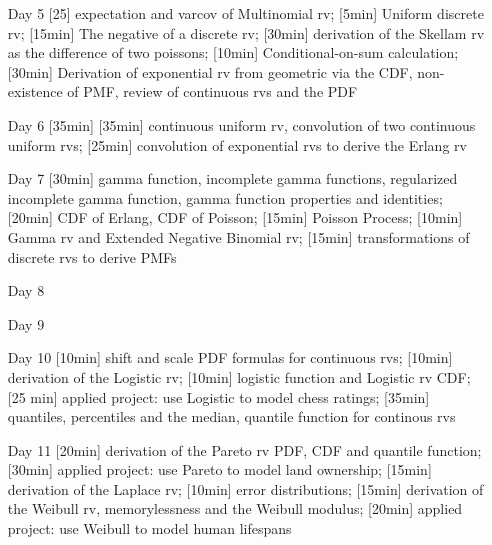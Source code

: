 \begin{enumerate}

\rule{8cm}{0.4pt} 


\item[Day 5] [25] expectation and varcov of Multinomial rv; [5min] Uniform discrete rv; [15min] The negative of a discrete rv; [30min] derivation of the Skellam rv as the difference of two poissons; [10min] Conditional-on-sum calculation; [30min] Derivation of exponential rv from geometric via the CDF, non-existence of PMF, review of continuous rvs and the PDF

\item[Day 6] [35min]  [35min] continuous uniform rv, convolution of two continuous uniform rvs; [25min] convolution of exponential rvs to derive the Erlang rv

\item[Day 7] [30min] gamma function, incomplete gamma functions, regularized incomplete gamma function, gamma function properties and identities; [20min] CDF of Erlang, CDF of Poisson; [15min] Poisson Process; [10min] Gamma rv and Extended Negative Binomial rv; [15min] transformations of discrete rvs to derive PMFs


\item[Day 8] 
\item[Day 9] 

\item[Day 10]  [10min] shift and scale PDF formulas for continuous rvs; [10min] derivation of the Logistic rv; [10min] logistic function and Logistic rv CDF; [25 min] applied project: use Logistic to model chess ratings; [35min] quantiles, percentiles and the median, quantile function for continous rvs


\item[Day 11] [20min] derivation of the Pareto rv PDF, CDF and quantile function; [30min] applied project: use Pareto to model land ownership; [15min] derivation of the Laplace rv; [10min] error distributions; [15min] derivation of the Weibull rv, memorylessness and the Weibull modulus; [20min] applied project: use Weibull to model human lifespans


\end{enumerate}
